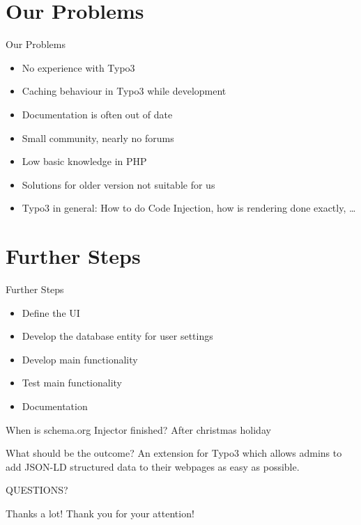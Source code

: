 \documentclass{beamer}
\begin{document}
\section{Our Problems}

\begin{frame}{Our Problems}
\begin{itemize}
\item No experience with Typo3
\item Caching behaviour in Typo3 while development
\item Documentation is often out of date
\item Small community, nearly no forums
\item Low basic knowledge in PHP
\item Solutions for older version not suitable for us
\item Typo3 in general: How to do Code Injection, how is rendering done exactly, \dots
\end{itemize}
\end{frame}



\section{Further Steps}

\begin{frame}{Further Steps}

\begin{itemize}
\item Define the UI
\item Develop the database entity for user settings
\item Develop main functionality
\item Test main functionality
\item Documentation
\end{itemize}


\begin{block}{When is schema.org Injector finished?}
After christmas holiday
\end{block}

\begin{block}{What should be the outcome?}
An extension for Typo3 which allows admins to add JSON-LD structured data to their webpages as easy as possible.
\end{block}
\end{frame}

\begin{frame}{}
	QUESTIONS?
\end{frame}

\begin{frame}{Thanks a lot!}
	Thank you for your attention!
\end{frame}
\end{document}
